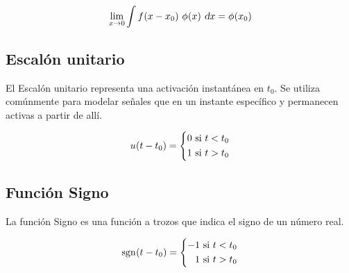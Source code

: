 \begin{mdframed}[style=PropertyFrame]
    \begin{prop}
        \label{prop:limDebil}
    \end{prop}
    \begin{equation*}
        \lim_{x \to 0}{\int \fx{x-x_0} \, \fx[\phi]{x} \, \dif x} = \fx[\phi]{x_0}
    \end{equation*}
\end{mdframed}

\subsection{Escalón unitario}

El Escalón unitario representa una activación instantánea en $t_0$.
Se utiliza comúnmente para modelar señales que  en un instante específico y permanecen activas a partir de allí.

\begin{mdframed}[style=DefinitionFrame]
    \begin{defn}
    \end{defn}
    \[
        \fx[u]{t - t_0} =
        \left\{
        \begin{aligned}
            0 \text{ si $t < t_0$}
            \\
            1 \text{ si $t > t_0$}
        \end{aligned}
        \right.
    \]
\end{mdframed}

\begin{center}
    \def\svgwidth{0.6\linewidth}
    
\end{center}

\subsection{Función Signo}

La función Signo es una función a trozos que indica el signo de un número real.

\begin{mdframed}[style=DefinitionFrame]
    \begin{defn}
    \end{defn}
    \[
        \fx[\sgn]{t - t_0} =
        \left\{
        \begin{aligned}
            -1 \text{ si $t < t_0$}
            \\
            1 \text{ si $t > t_0$}
        \end{aligned}
        \right.
    \]
\end{mdframed}

